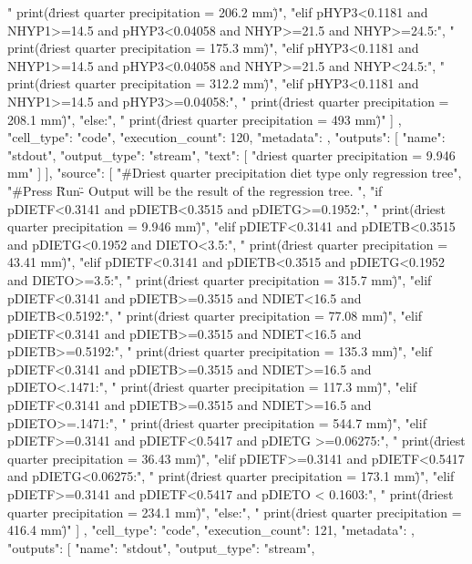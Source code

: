 {{    "    print(\"driest quarter precipitation = 206.2 mm\")\n",
    "elif pHYP3<0.1181 and NHYP1>=14.5 and pHYP3<0.04058 and NHYP>=21.5 and NHYP>=24.5:\n",
    "    print(\"driest quarter precipitation = 175.3 mm\")\n",
    "elif pHYP3<0.1181 and NHYP1>=14.5 and pHYP3<0.04058 and NHYP>=21.5 and NHYP<24.5:\n",
    "    print(\"driest quarter precipitation = 312.2 mm\")\n",
    "elif pHYP3<0.1181 and NHYP1>=14.5 and pHYP3>=0.04058:\n",
    "    print(\"driest quarter precipitation = 208.1 mm\")\n",
    "else:\n",
    "    print(\"driest quarter precipitation = 493 mm\")"
   ]
  },
  {
   "cell_type": "code",
   "execution_count": 120,
   "metadata": {},
   "outputs": [
    {
     "name": "stdout",
     "output_type": "stream",
     "text": [
      "driest quarter precipitation = 9.946 mm\n"
     ]
    }
   ],
   "source": [
    "#Driest quarter precipitation diet type only regression tree\n",
    "#Press \"Run\" - Output will be the result of the regression tree. \n",
    "if pDIETF<0.3141 and pDIETB<0.3515 and pDIETG>=0.1952:\n",
    "    print(\"driest quarter precipitation = 9.946 mm\")\n",
    "elif pDIETF<0.3141 and pDIETB<0.3515 and pDIETG<0.1952 and DIETO<3.5:\n",
    "    print(\"driest quarter precipitation = 43.41 mm\")\n",
    "elif pDIETF<0.3141 and pDIETB<0.3515 and pDIETG<0.1952 and DIETO>=3.5:\n",
    "    print(\"driest quarter precipitation = 315.7 mm\")\n",
    "elif pDIETF<0.3141 and pDIETB>=0.3515 and NDIET<16.5 and pDIETB<0.5192:\n",
    "    print(\"driest quarter precipitation = 77.08 mm\")\n",
    "elif pDIETF<0.3141 and pDIETB>=0.3515 and NDIET<16.5 and pDIETB>=0.5192:\n",
    "    print(\"driest quarter precipitation = 135.3 mm\")\n",
    "elif pDIETF<0.3141 and pDIETB>=0.3515 and NDIET>=16.5 and pDIETO<.1471:\n",
    "    print(\"driest quarter precipitation = 117.3 mm\")\n",
    "elif pDIETF<0.3141 and pDIETB>=0.3515 and NDIET>=16.5 and pDIETO>=.1471:\n",
    "    print(\"driest quarter precipitation = 544.7 mm\")\n",
    "elif pDIETF>=0.3141 and pDIETF<0.5417 and pDIETG >=0.06275:\n",
    "    print(\"driest quarter precipitation = 36.43 mm\")\n",
    "elif pDIETF>=0.3141 and pDIETF<0.5417 and pDIETG<0.06275:\n",
    "    print(\"driest quarter precipitation = 173.1 mm\")\n",
    "elif pDIETF>=0.3141 and pDIETF<0.5417 and pDIETO < 0.1603:\n",
    "    print(\"driest quarter precipitation = 234.1 mm\")\n",
    "else:\n",
    "    print(\"driest quarter precipitation = 416.4 mm\")"
   ]
  },
  {
   "cell_type": "code",
   "execution_count": 121,
   "metadata": {},
   "outputs": [
    {
     "name": "stdout",
     "output_type": "stream",
}}}
